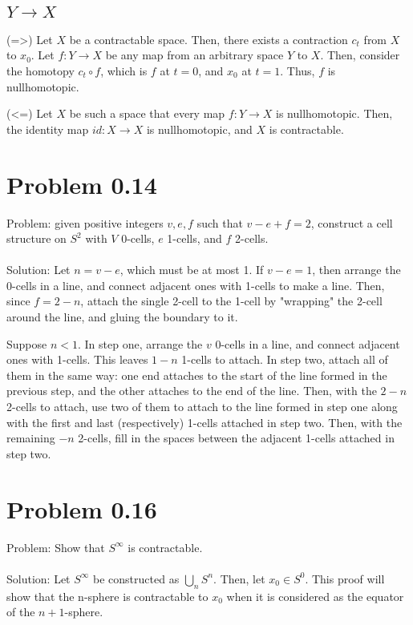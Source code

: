 \documentclass[paper=a4, fontsize=11pt]{scrartcl} %
\numberwithin{equation}{section} %
\numberwithin{figure}{section} %
\numberwithin{table}{section} %
\begin{document}
\subsection*{$Y\to X$}
(=>) Let $X$ be a contractable space. Then, there exists a contraction $c_t$ from $X$ to $x_0$.
Let $f:Y\to X$ be any map from an arbitrary space $Y$ to $X$. Then, consider the homotopy
$ c_t \circ f$, which is $f$ at $t=0$, and $x_0$ at $t=1$. Thus, $f$ is nullhomotopic.

(<=) Let $X$ be such a space that every map $f:Y\to X$ is nullhomotopic. Then, the identity
map $id:X\to X$ is nullhomotopic, and $X$ is contractable.



\section*{Problem 0.14}
Problem: given positive integers $v, e, f$ such that $v - e + f = 2$, construct a cell structure on
$S^2$ with $V$ 0-cells, $e$ 1-cells, and $f$ 2-cells.
\\
\\
Solution: Let $n = v - e$, which must be at most 1. If $v-e=1$, then arrange the 0-cells in a
line, and connect adjacent ones with 1-cells to make a line. Then, since $f = 2 - n$, attach the
single 2-cell to the 1-cell by "wrapping" the 2-cell around the line, and gluing the boundary to it.

Suppose $n < 1$. In step one, arrange the $v$ 0-cells in a line, and connect adjacent ones with 1-cells.
This leaves $1-n$ 1-cells to attach. In step two, attach all of them in the same way: one end attaches to the
start of the line formed in the previous step, and the other attaches to the end of the line. Then, with
the $2-n$ 2-cells to attach, use two of them to attach to the line formed in step one along with the first
and last (respectively) 1-cells attached in step two. Then, with the remaining $-n$ 2-cells, fill in the spaces
between the adjacent 1-cells attached in step two.

\section*{Problem 0.16}
Problem: Show that $S^{\infty}$ is contractable.
\\
\\
Solution:
Let $S^{\infty}$ be constructed as $\bigcup_n S^n$. Then, let $x_0 \in S^0$. This proof will show that
the n-sphere is contractable to $x_0$ when it is considered as the equator of the $n+1$-sphere.
\end{document}

